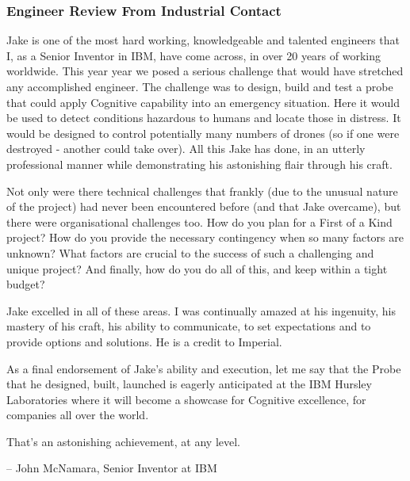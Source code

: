 \documentclass{article}
\begin{document}
\subsubsection{Engineer Review From Industrial Contact}\label{JonReview}
\begin{itshape}
Jake is one of the most hard working, knowledgeable and talented engineers that I, as a Senior Inventor in IBM, have come across, in over 20 years of working worldwide.  This year year we posed a serious challenge that would have stretched any accomplished engineer. The challenge was to design, build and test a probe that could apply Cognitive capability into an emergency situation. Here it would be used to detect conditions hazardous to humans and locate those in distress. It would be designed to control  potentially many numbers of drones (so if one were destroyed - another could take over). All this Jake has done, in an utterly professional manner while demonstrating his astonishing flair through his craft.

Not only were there technical challenges that frankly (due to the unusual nature of the project) had never been encountered before (and that Jake overcame), but there were organisational challenges too. How do you plan for a First of a Kind project? How do you provide the necessary contingency when so many factors are unknown? What factors are crucial to the success of such a challenging and unique project? And finally, how do you do all of this, and keep within a tight budget?
 
Jake excelled in all of these areas. I was continually amazed at his ingenuity, his mastery of his craft, his ability to communicate, to set expectations and to provide options and solutions. He is a credit to Imperial.

As a final endorsement of Jake's ability and execution, let me say that the Probe that he designed, built, launched is eagerly anticipated at the IBM Hursley Laboratories where it will become a showcase for Cognitive excellence, for companies all over the world.

That's an astonishing achievement, at any level.\end{itshape} -- John McNamara, Senior Inventor at IBM
\end{document}
